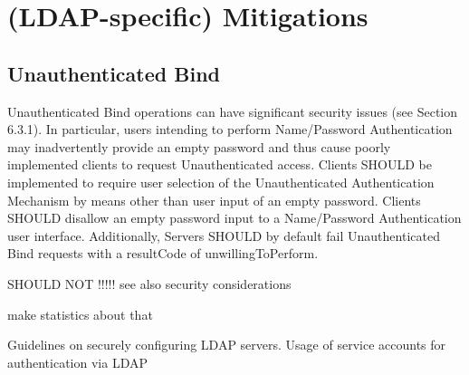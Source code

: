 \section{(LDAP-specific) Mitigations}
\label{sec:mitigations}








\subsection{Unauthenticated Bind}

Unauthenticated Bind operations can have significant security issues
   (see Section 6.3.1).  In particular, users intending to perform
   Name/Password Authentication may inadvertently provide an empty
   password and thus cause poorly implemented clients to request
   Unauthenticated access.  Clients SHOULD be implemented to require
   user selection of the Unauthenticated Authentication Mechanism by
   means other than user input of an empty password.  Clients SHOULD
   disallow an empty password input to a Name/Password Authentication
   user interface.  Additionally, Servers SHOULD by default fail
   Unauthenticated Bind requests with a resultCode of
   unwillingToPerform.

SHOULD NOT !!!!! see also security considerations

make statistics about that


Guidelines on securely configuring LDAP servers.
Usage of service accounts for authentication via LDAP
